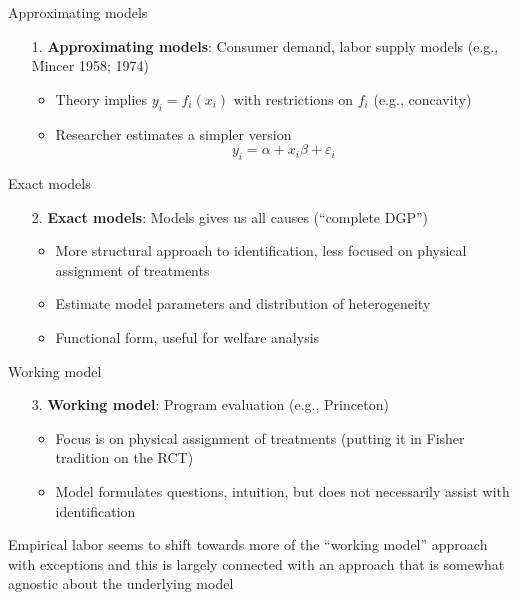 \documentclass{beamer}
\begin{document}
\begin{frame}{Approximating models}

  \begin{enumerate}
    \item[1. ] \textbf{Approximating models}: Consumer demand, labor supply models (e.g., Mincer 1958; 1974)
          \begin{itemize}
            \item Theory implies $y_i=f_i(x_i)$ with restrictions on $f_i$ (e.g., concavity)
            \item Researcher estimates a simpler version $$y_i = \alpha + x_i \beta + \varepsilon_i$$
          \end{itemize}
  \end{enumerate}

\end{frame}

\begin{frame}{Exact models}

  \begin{enumerate}
    \item[2. ] \textbf{Exact models}: Models gives us all causes (``complete DGP'')
          \begin{itemize}
            \item More structural approach to identification, less focused on physical assignment of treatments
            \item Estimate model parameters and distribution of heterogeneity
            \item Functional form, useful for welfare analysis
          \end{itemize}
  \end{enumerate}

\end{frame}

\begin{frame}{Working model}

  \begin{enumerate}
    \item[3. ] \textbf{Working model}: Program evaluation (e.g., Princeton)
          \begin{itemize}
            \item Focus is on physical assignment of treatments (putting it in Fisher tradition on the RCT)
            \item Model formulates questions, intuition, but does not necessarily assist with identification
          \end{itemize}
  \end{enumerate}

  \bigskip

  Empirical labor seems to shift towards more of the ``working model'' approach with exceptions and this is largely connected with an approach that is somewhat agnostic about the underlying model

\end{frame}
\end{document}
